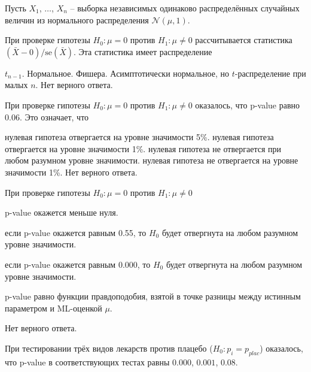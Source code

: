 \documentclass[10pt, a4paper]{exam}
\begin{document}
	Пусть $X_1$, $\ldots$, $X_n$ -- выборка независимых одинаково распределённых случайных величин из нормального распределения $\mathcal{N}(\mu, 1)$.
	
	\begin{questions}
		\question При проверке гипотезы $H_0: \mu = 0$ против $H_1: \mu \ne 0$ рассчитывается статистика $(\bar{X} - 0)/\mathrm{se}(\bar{X})$. Эта статистика имеет распределение
		\begin{choices}
			\choice $t_{n-1}$.
			\choice Нормальное.
			\choice Фишера.
			\choice Асимптотически нормальное, но $t$-распределение при малых $n$.
			\choice Нет верного ответа.
		\end{choices}
	
		\question При проверке гипотезы $H_0: \mu = 0$ против $H_1: \mu \ne 0$ оказалось, что p-value равно 0.06. Это означает, что
		\begin{choices}
			\choice нулевая гипотеза отвергается на уровне значимости 5\%.
			\choice нулевая гипотеза отвергается на уровне значимости 1\%.
			\choice нулевая гипотеза не отвергается при любом разумном уровне значимости.
			\choice нулевая гипотеза не отвергается на уровне значимости 1\%.
			\choice Нет верного ответа.
		\end{choices}
	
		\question При проверке гипотезы $H_0: \mu = 0$ против $H_1: \mu \ne 0$
		\begin{choices}
			\item p-value окажется меньше нуля.
			\item если p-value окажется равным 0.55, то $H_0$ будет отвергнута на любом разумном уровне значимости.
			\item если p-value окажется равным 0.000, то $H_0$ будет отвергнута на любом разумном уровне значимости.
			\item p-value равно функции правдоподобия, взятой в точке разницы между истинным параметром и ML-оценкой $\mu$.
			\item Нет верного ответа.
		\end{choices}
	\end{questions}

	При тестировании трёх видов лекарств против плацебо ($H_0: p_i = p_{plac}$) оказалось, что p-value в соответствующих тестах равны $0.000$, $0.001$, $0.08$.
	
\end{document}
